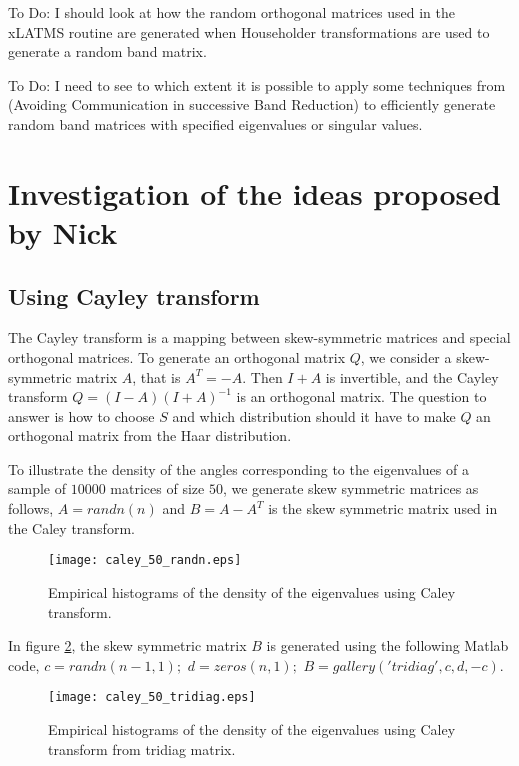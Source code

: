 \documentclass[a4paper]{article}
\begin{document}
{\color{red}To Do: I should look at how the random orthogonal matrices used in the xLATMS routine are 
generated when Householder transformations are used to generate a random band matrix. \\}

{\color{red}To Do: I need to see to which extent it is possible to apply some techniques from 
\cite{Ballard:2012:CAS:2370036.2145822} (Avoiding Communication in successive Band Reduction) to 
efficiently generate random band matrices with specified eigenvalues or singular values.}

\section{Investigation of the ideas proposed by Nick}

\subsection{Using Cayley transform}
The Cayley transform is a mapping between skew-symmetric matrices and special orthogonal matrices.
To generate an orthogonal matrix $Q$, we consider a skew-symmetric matrix $A$, that is $A^T = −A$. 
Then $I + A$ is invertible, and the Cayley transform $Q = (I - A)(I + A)^{-1}$ is an orthogonal matrix.
The question to answer is how to choose $S$ and which distribution should it have to make $Q$ an 
orthogonal matrix from the Haar distribution.

To illustrate the density of the angles corresponding to the eigenvalues of a sample of $10000$ matrices 
of size $50$, we generate skew symmetric matrices as follows, $A = randn(n)$ and $B = A - A^T$ is the 
skew symmetric matrix used in the Caley transform.

\begin{figure}[!htb]
\centering
\texttt{[image: caley\_50\_randn.eps]}
\caption{Empirical histograms of the density of the eigenvalues using Caley transform.}
\label{fig:caley1}
\end{figure}

In figure \ref{fig:caley2}, the skew symmetric matrix $B$ is generated using the following Matlab 
code, $c =randn(n-1,1);$ $d = zeros(n,1);$ $B = gallery('tridiag',c,d,-c)$.

\begin{figure}[!htb]
\centering
\texttt{[image: caley\_50\_tridiag.eps]}
\caption{Empirical histograms of the density of the eigenvalues using Caley transform from tridiag matrix.}
\label{fig:caley2}
\end{figure}
\end{document}
